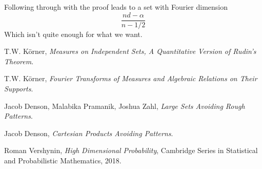 \documentclass[12pt,reqno]{article}
\numberwithin{equation}{section}
\begin{document}
Following through with the proof leads to a set with Fourier dimension
%
\[ \frac{nd - \alpha}{n - 1/2} \]
%
Which isn't quite enough for what we want.

\begin{thebibliography}{9}

    T.W. K\"{o}rner,
    \textit{Measures on Independent Sets, A Quantitative Version of Rudin's Theorem}.

    T.W. K\"{o}rner,
    \textit{Fourier Transforms of Measures and Algebraic Relations on Their Supports}.

    Jacob Denson, Malabika Pramanik, Joshua Zahl,
    \textit{Large Sets Avoiding Rough Patterns}.

    Jacob Denson,
    \textit{Cartesian Products Avoiding Patterns}.

    Roman Vershynin,
    \textit{High Dimensional Probability},
    Cambridge Series in Statistical and Probabilistic Mathematics,
    2018.

\end{thebibliography}
\end{document}
